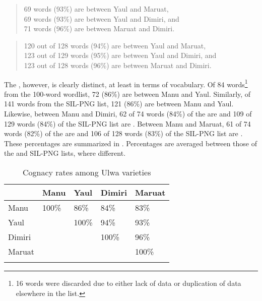 
\begin{quote}69 words (93\%) are  between Yaul and Maruat,\\
69 words (93\%) are  between Yaul and Dimiri, and\\
71 words (96\%) are  between Maruat and Dimiri.\end{quote}


\begin{quote}120 out of 128 words (94\%) are  between Yaul and Maruat,\\
123 out of 129 words (95\%) are  between Yaul and Dimiri, and\\
123 out of 128 words (96\%) are  between Maruat and Dimiri.\end{quote}


  The  , however, is clearly distinct, at least in terms of vocabulary. Of 84 words\footnote{16 words were discarded due to either lack of data or duplication of data elsewhere in the list.} from the   100-word wordlist, 72 (86\%) are  between Manu and Yaul. Similarly, of 141 words from the SIL-PNG list, 121 (86\%) are  between Manu and Yaul. Likewise, between Manu and Dimiri, 62 of 74 words (84\%) of the  are  and 109 of 129 words (84\%) of the SIL-PNG list are . Between Manu and Maruat, 61 of 74 words (82\%) of the  are  and 106 of 128 words (83\%) of the SIL-PNG list are . These percentages are summarized in . Percentages are averaged between those of the  and SIL-PNG lists, where different.


\begin{table}
\caption{Cognacy rates among Ulwa varieties}
\label{tab:18.1}


\begin{tabular}{lllll}
\lsptoprule
& Manu & Yaul & Dimiri & Maruat\\
\midrule
Manu & 100\% & 86\% & 84\% & 83\%\\
Yaul &  & 100\% & 94\% & 93\%\\
Dimiri &  &  & 100\% & 96\%\\
Maruat &  &  &  & 100\%\\
\lspbottomrule
\end{tabular}
\end{table}


